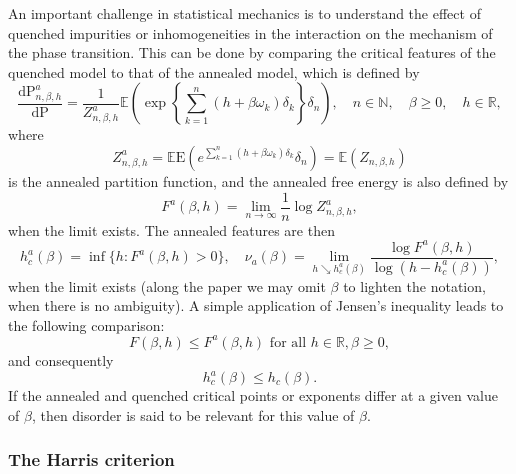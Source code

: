 \documentclass[11pt]{article}
\theoremstyle{definition}
\numberwithin{equation}{section}
\numberwithin{figure}{section}
\numberwithin{table}{section}
\newcommand{\bbE}{{\ensuremath{\mathbb E}}}
\newcommand{\bbN}{{\ensuremath{\mathbb N}}}
\newcommand{\bbR}{{\ensuremath{\mathbb R}}}
\newcommand{\gb}{\beta}
\newcommand{\gd}{\delta}
\newcommand{\go}{\omega}
\newcommand{\dd}{\mathrm{d}}
\newcommand{\R}{\mathbb{R}}
\newcommand\bP{\ensuremath{\mathrm{P}}}
\newcommand\bE{\ensuremath{\mathrm{E}}}
\begin{document}
An important challenge in statistical mechanics is to understand the effect of quenched impurities or inhomogeneities in the interaction on the mechanism of the phase transition. This can be done by comparing the critical features of the quenched model to that of the annealed model, which is defined by
\begin{equation}\label{eq:defannmeas}
\frac{\dd \bP^a_{n,\gb,h}}{\dd \bP} = \frac{1}{Z^a_{n,\gb,h}} \bbE\left(\exp \left\{ \sum_{k=1}^n (h + \gb \go_k) \gd_k \right\} \gd_n \right), \quad n \in \bbN, \quad \gb \geq 0,\quad h \in \bbR,
\end{equation}
where
\begin{equation}\label{eq:defannpf}
Z^a_{n,\gb,h} = \bbE\bE\left(e^{\sum_{k=1}^n (h+ \gb \go_k)\gd_k} \gd_n\right) = \bbE (Z_{n, \gb, h})
\end{equation}
is the annealed partition function, and the annealed free energy is also defined by
\begin{equation}
F^a(\gb,h) = \lim_{n \to \infty} \frac{1}{n} \log Z^a_{n,\gb,h},
\end{equation}
when the limit exists. The annealed features are then
\begin{equation}
h^a_c(\gb) = \inf\{h \colon F^a(\gb,h) > 0\}, \quad \nu_a(\gb) = \lim_{h \searrow h_c^a(\gb)} \frac{\log F^a(\gb,h)}{\log (h - h_c^a(\gb))},
\end{equation}
when the limit exists (along the paper we may omit $\beta$ to lighten the notation, when there is no ambiguity). A simple application of Jensen's inequality leads to the following comparison:
\begin{equation}
F(\gb,h) \leq F^a(\gb,h) \text{ for all } h\in \R, \gb\ge0,
\end{equation}
and consequently
\begin{equation}
h_c^a(\gb) \leq h_c(\gb).
\end{equation}
If the annealed and quenched critical points or exponents differ at a given value of $\gb$, then disorder is said to be relevant for this value of $\beta$.

\subsubsection{The Harris criterion}
\end{document}
